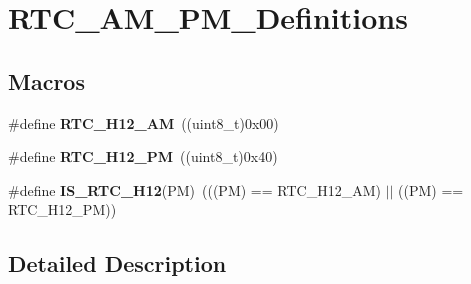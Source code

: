 \hypertarget{group___r_t_c___a_m___p_m___definitions}{\section{R\-T\-C\-\_\-\-A\-M\-\_\-\-P\-M\-\_\-\-Definitions}
\label{group___r_t_c___a_m___p_m___definitions}
}
\subsection*{Macros}
\begin{DoxyCompactItemize}
\item 
\hypertarget{group___r_t_c___a_m___p_m___definitions_ga86861d15dab24bfbf2ea9c1aec7b492f}{\#define {\bfseries R\-T\-C\-\_\-\-H12\-\_\-\-A\-M}~((uint8\-\_\-t)0x00)}\label{group___r_t_c___a_m___p_m___definitions_ga86861d15dab24bfbf2ea9c1aec7b492f}

\item 
\hypertarget{group___r_t_c___a_m___p_m___definitions_ga82a5381a1d266841a7fb75820dcad5de}{\#define {\bfseries R\-T\-C\-\_\-\-H12\-\_\-\-P\-M}~((uint8\-\_\-t)0x40)}\label{group___r_t_c___a_m___p_m___definitions_ga82a5381a1d266841a7fb75820dcad5de}

\item 
\hypertarget{group___r_t_c___a_m___p_m___definitions_ga98f8d66c8fed6039f9a58d78b8c512b5}{\#define {\bfseries I\-S\-\_\-\-R\-T\-C\-\_\-\-H12}(P\-M)~(((P\-M) == R\-T\-C\-\_\-\-H12\-\_\-\-A\-M) $|$$|$ ((P\-M) == R\-T\-C\-\_\-\-H12\-\_\-\-P\-M))}\label{group___r_t_c___a_m___p_m___definitions_ga98f8d66c8fed6039f9a58d78b8c512b5}

\end{DoxyCompactItemize}


\subsection{Detailed Description}
